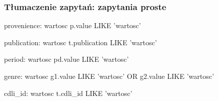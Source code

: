 \begin{frame}
 \frametitle{Tłumaczenie zapytań: zapytania proste}
\begin{block}{provenience: wartosc}
p.value LIKE 'wartosc'
\end{block}

\begin{block}{publication: wartosc}
t.publication LIKE ’wartosc’
\end{block}

\begin{block}{period: wartosc}
pd.value LIKE 'wartosc'
\end{block}

\begin{block}{genre: wartosc}
g1.value LIKE 'wartosc' OR g2.value LIKE 'wartosc'
\end{block}

\begin{block}{cdli\_id: wartosc}
 t.cdli\_id LIKE 'wartosc'
\end{block}


\end{frame}


